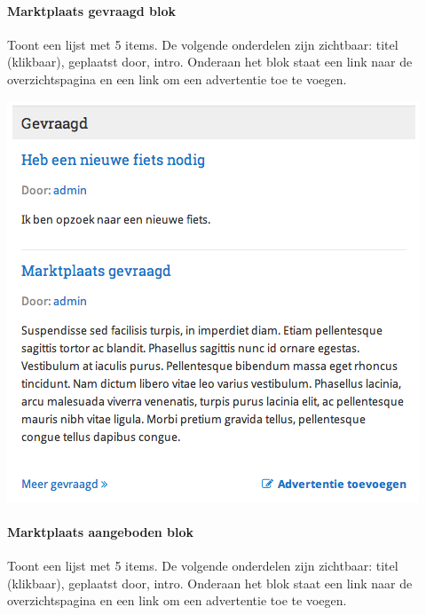 \paragraph{Marktplaats gevraagd blok}

Toont een lijst met 5 items. De volgende onderdelen zijn zichtbaar: titel (klikbaar), geplaatst door, intro. Onderaan het blok staat een link naar de overzichtspagina en een link om een advertentie toe te voegen.

\begin{center}
	\includegraphics[scale=0.5]{img/blokken/marktplaatsgevraagd.png}
\end{center}

\paragraph{Marktplaats aangeboden blok}

Toont een lijst met 5 items. De volgende onderdelen zijn zichtbaar: titel (klikbaar), geplaatst door, intro. Onderaan het blok staat een link naar de overzichtspagina en een link om een advertentie toe te voegen.

